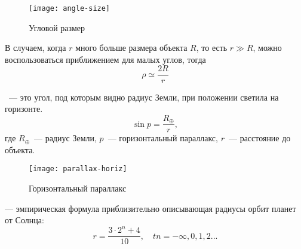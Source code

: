 \begin{figure}[h!]
\centering
\texttt{[image: angle-size]}
\caption{Угловой размер}
\end{figure}

В случаем, когда $r$ много больше размера объекта $R$, то есть $r\gg R$, можно воспользоваться приближением для малых углов, тогда \begin{equation}
	\rho \simeq \frac{2 R}{r}
\end{equation}

~--- это угол, под которым видно радиус Земли, при положении светила на горизонте.
\begin{equation}
\sin p=\frac{R_\oplus}{r},
\end{equation}
где $R_\oplus$~--- радиус Земли, $p$~--- горизонтальный параллакс, $r$~--- 
расстояние до объекта.

\begin{figure}[h!]
\centering
\texttt{[image: parallax-horiz]}
\caption{Горизонтальный параллакс}
\end{figure}

 --- эмпирическая формула приблизительно описывающая 
радиусы орбит планет от Солнца:
\begin{equation}r=\frac{3\cdot 2^n+4}{10}, \quad tn=-\infty, 0, 1, 2...
\end{equation}

